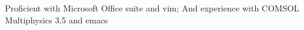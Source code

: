 \item Proficient with Microsoft Office suite and vim; And experience with COMSOL Multiphysics 3.5 and emacs

